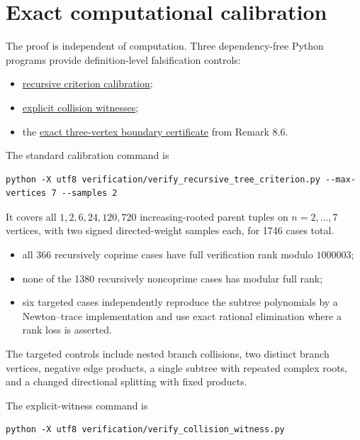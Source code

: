 \documentclass[11pt]{article}
\theoremstyle{remark}
\begin{document}
\section{Exact computational calibration}


The proof is independent of computation. Three dependency-free Python programs provide definition-level falsification controls:

\begin{itemize}
\item \href{verification/verify_recursive_tree_criterion.py}{recursive criterion calibration};
\item \href{verification/verify_collision_witness.py}{explicit collision witnesses};
\item the \href{verification/verify_minimal_counterexample.py}{exact three-vertex boundary certificate} from Remark 8.6.
\end{itemize}


The standard calibration command is

\begin{Verbatim}[breaklines=true,breakanywhere=true,fontsize=\small]
python -X utf8 verification/verify_recursive_tree_criterion.py --max-vertices 7 --samples 2
\end{Verbatim}


It covers all $1,2,6,24,120,720$ increasing-rooted parent tuples on $n=2,\ldots,7$ vertices, with two signed directed-weight samples each, for 1746 cases total.

\begin{itemize}
\item all 366 recursively coprime cases have full verification rank modulo $1000003$;
\item none of the 1380 recursively noncoprime cases has modular full rank;
\item six targeted cases independently reproduce the subtree polynomials by a Newton--trace implementation and use exact rational elimination where a rank loss is asserted.
\end{itemize}


The targeted controls include nested branch collisions, two distinct branch vertices, negative edge products, a single subtree with repeated complex roots, and a changed directional splitting with fixed products.

The explicit-witness command is

\begin{Verbatim}[breaklines=true,breakanywhere=true,fontsize=\small]
python -X utf8 verification/verify_collision_witness.py
\end{Verbatim}
\end{document}
